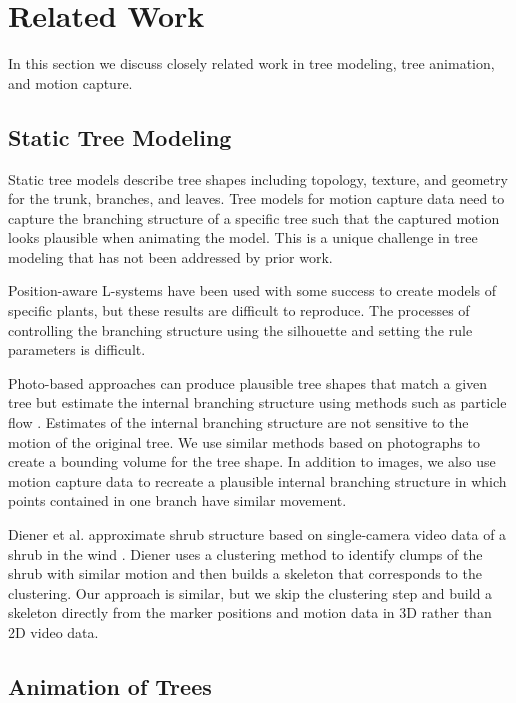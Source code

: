 \section{Related Work} 

In this section we discuss closely related work in tree modeling, tree animation, and motion capture.   

\subsection{Static Tree Modeling}

Static tree models describe tree shapes including topology, texture, and geometry for the trunk, branches, and leaves.  Tree models for motion capture data need to capture the branching structure of a specific tree such that the captured motion looks plausible when animating the model.   This is a unique challenge in tree modeling that has not been addressed by prior work.  

Position-aware L-systems \cite{Prusinkiewicz:2001} have been used with some success to create models of specific plants, but these results are difficult to reproduce.  The processes of controlling the branching structure using the silhouette and setting the rule parameters is difficult.

Photo-based approaches \cite{neubert:acmtg07,RecheMartinez2004,Tan:2007:ITM} can produce plausible tree shapes that match a given tree but estimate the internal branching structure using methods such as particle flow \cite{neubert:acmtg07}. Estimates of the internal branching structure are not sensitive to the motion of the original tree.  We use similar methods based on photographs to create a bounding volume for the tree shape. In addition to images, we also use motion capture data to recreate a plausible internal branching structure in which points contained in one branch have similar movement.

Diener et al. approximate shrub structure based on single-camera video data of a shrub in the wind \cite{Diener:2006}. Diener uses a clustering method to identify clumps of the shrub with similar motion and then builds a skeleton that corresponds to the clustering.  Our approach is similar, but we skip the clustering step and build a skeleton directly from the marker positions and motion data in 3D rather than 2D video data.  

\subsection{Animation of Trees}

